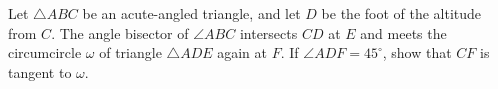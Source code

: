 Let $\triangle ABC$ be an acute-angled triangle, and let $D$ be the foot of the altitude from $C.$ The angle bisector of $\angle ABC$ intersects $CD$ at $E$ and meets the circumcircle $\omega$ of triangle $\triangle ADE$ again at $F$. If $\angle ADF = 45^{\circ}$, show that $CF$ is tangent to $\omega$.